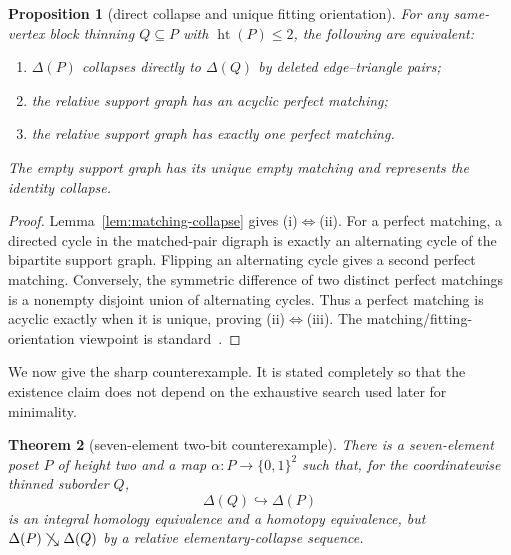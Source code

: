 \documentclass[11pt]{article}
\newtheorem{theorem}{Theorem}[section]
\newtheorem{proposition}[theorem]{Proposition}
\theoremstyle{definition}
\theoremstyle{remark}
\DeclareMathOperator{\posht}{ht}
\newcommand{\D}{\Delta}
\newcommand{\searrowrel}{\mathrel{\searrow}}
\begin{document}
\begin{proposition}[direct collapse and unique fitting orientation]\label{prop:unique-matching}
For any same-vertex block thinning $Q\subseteq P$ with $\posht(P)\le2$, the following are
equivalent:
\begin{enumerate}[label=(\roman*)]
\item $\D(P)$ collapses directly to $\D(Q)$ by deleted edge--triangle pairs;
\item the relative support graph has an acyclic perfect matching;
\item the relative support graph has exactly one perfect matching.
\end{enumerate}
The empty support graph has its unique empty matching and represents the identity
collapse.
\end{proposition}

\begin{proof}
Lemma~\ref{lem:matching-collapse} gives (i)$\Longleftrightarrow$(ii).  For a perfect
matching, a directed cycle in the matched-pair digraph is exactly an alternating cycle
of the bipartite support graph.  Flipping an alternating cycle gives a second perfect
matching.  Conversely, the symmetric difference of two distinct perfect matchings is
a nonempty disjoint union of alternating cycles.  Thus a perfect matching is acyclic
exactly when it is unique, proving (ii)$\Longleftrightarrow$(iii).  The
matching/fitting-orientation viewpoint is standard~\cite{Forman1998,BernardiKlivans2016}.
\end{proof}

We now give the sharp counterexample.  It is stated completely so that the existence
claim does not depend on the exhaustive search used later for minimality.

\begin{theorem}[seven-element two-bit counterexample]\label{thm:seven}
There is a seven-element poset $P$ of height two and a map
$\alpha:P\to\{0,1\}^2$ such that, for the coordinatewise thinned suborder $Q$,
\[
  \D(Q)\hookrightarrow\D(P)
\]
is an integral homology equivalence and a homotopy equivalence, but
$\D(P)\not\searrowrel\D(Q)$ by a relative elementary-collapse sequence.
\end{theorem}
\end{document}
